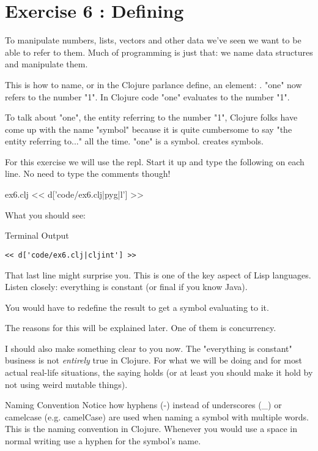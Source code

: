 \chapter{Exercise 6 : Defining }

To manipulate numbers, lists, vectors and other data we've seen 
we want to be able to refer to them. Much of programming is just that:
we name data structures and manipulate them.

This is how to name, or in the Clojure parlance define, an element:
. "one" now refers to the number "1". In Clojure code
"one" evaluates to the number "1".

To talk about "one", the entity referring to the number "1", Clojure folks have
come up with the name "symbol" because it is quite cumbersome to say "the entity referring to..." all the time. "one" is a symbol.  creates symbols.

For this exercise we will use the repl. Start it up and type the following on each line. No need to type the comments though!

\begin{code}{ex6.clj}
<< d['code/ex6.clj|pyg|l'] >>
\end{code} 

What you should see:
\begin{code}{Terminal Output}
\begin{Verbatim}
<< d['code/ex6.clj|cljint'] >>
\end{Verbatim}
\end{code}

That last line might surprise you. This is one of the key aspect of Lisp languages. Listen closely: everything is constant (or final if you know Java).

You would have to redefine the result to get a symbol evaluating to it.

The reasons for this will be explained later. One of them is concurrency.

I should also make something clear to you now. The "everything is constant" business is not {\em entirely} true in Clojure. For what we will be doing and
for most actual real-life situations, the saying holds (or at least you should make it hold by not using weird mutable things). 

\begin{aside}{Naming Convention}
Notice how hyphens (-) instead of underscores (\_) or camelcase (e.g. camelCase) are used when naming a symbol with multiple words. This is the naming convention in Clojure. Whenever you would use a space in normal writing use a hyphen for the symbol's name.
\end{aside}
